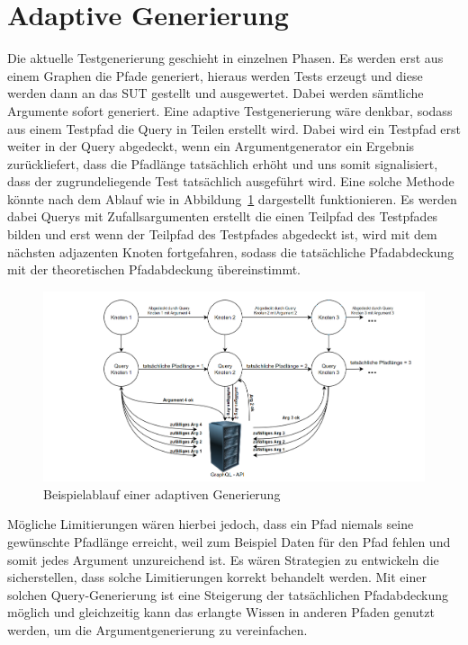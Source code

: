 \section{Adaptive Generierung}

Die aktuelle Testgenerierung geschieht in einzelnen Phasen.
Es werden erst aus einem Graphen die Pfade generiert, hieraus werden Tests erzeugt und diese werden dann an das SUT gestellt und ausgewertet.
Dabei werden sämtliche Argumente sofort generiert.
Eine adaptive Testgenerierung wäre denkbar, sodass aus einem Testpfad die Query in Teilen erstellt wird.
Dabei wird ein Testpfad erst weiter in der Query abgedeckt, wenn ein Argumentgenerator ein Ergebnis zurückliefert, dass die Pfadlänge tatsächlich erhöht
und uns somit signalisiert, dass der zugrundeliegende Test tatsächlich ausgeführt wird.
Eine solche Methode könnte nach dem Ablauf wie in Abbildung~\ref{adaptive} dargestellt funktionieren.
Es werden dabei Querys mit Zufallsargumenten erstellt die einen Teilpfad des Testpfades bilden und erst wenn der Teilpfad des Testpfades abgedeckt ist, wird mit dem nächsten adjazenten Knoten fortgefahren,
sodass die tatsächliche Pfadabdeckung mit der theoretischen Pfadabdeckung übereinstimmt.

\begin{figure}[H]
    \begin{center}
        \includegraphics[width=\textwidth,keepaspectratio]{img/ablauffuturework}
    \end{center}
    \caption{Beispielablauf einer adaptiven Generierung}
    \label{adaptive}
\end{figure}

Mögliche Limitierungen wären hierbei jedoch, dass ein Pfad niemals seine gewünschte Pfadlänge erreicht, weil zum Beispiel Daten für den Pfad fehlen und somit jedes Argument unzureichend ist.
Es wären Strategien zu entwickeln die sicherstellen, dass solche Limitierungen korrekt behandelt werden.
Mit einer solchen Query-Generierung ist eine Steigerung der tatsächlichen Pfadabdeckung möglich und gleichzeitig kann das erlangte Wissen in anderen Pfaden genutzt werden,
um die Argumentgenerierung zu vereinfachen.




